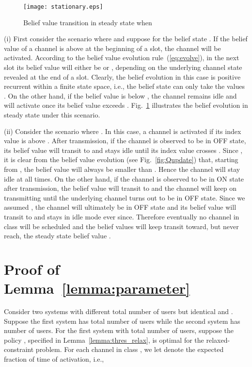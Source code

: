 \documentclass[11pt,twocolumn]{IEEEtran}
\begin{document}
\begin{figure}
\centering
\texttt{[image: stationary.eps]}
\vspace{-4pt}
\caption{Belief value transition in steady state when }
\vspace{-3pt}
\label{fig:belief_pos}
\end{figure}

(i) First consider the scenario where  and suppose  for the belief state . If the belief value of a channel is above  at the beginning of a slot, the channel will be activated. According to the belief value evolution rule~(\ref{eq:evolve}), in the next slot its belief value will either be  or , depending on the underlying channel state revealed at the end of a slot. Clearly, the belief evolution in this case is positive recurrent within a finite state space, i.e., the belief state can only take the values . On the other hand, if the belief value is below , the channel remains idle and will activate once its belief value exceeds . Fig.~\ref{fig:belief_pos} illustrates the belief evolution in steady state under this scenario.
\vspace{4pt}

(ii) Consider the scenario where . In this case, a channel is activated if its index value is above . After transmission, if the channel is observed to be in OFF state, its belief value will transit to  and stays idle until its index value crosses . Since , it is clear from the belief value evolution (see Fig.~\ref{fig:Qupdate}) that, starting from , the belief value will always be smaller than . Hence the channel will stay idle at all times. On the other hand, if the channel is observed to be in ON state after transmission, the belief value will transit to  and the channel will keep on transmitting until the underlying channel turns out to be in OFF state. Since we assumed , the channel will ultimately be in OFF state and its belief value will transit to  and stays in idle mode ever since. Therefore eventually no channel in class  will be scheduled and the belief values will keep transit toward, but never reach, the steady state belief value .

\section{Proof of Lemma~\ref{lemma:parameter}}
\label{appen:peruser}

Consider two systems with different total number of users but identical  and . Suppose the first system has  total number of users while the second system has  number of users. For the first system with  total number of users, suppose the policy , specified in Lemma~\ref{lemma:thres_relax}, is optimal for the relaxed-constraint problem. For each channel  in class , we let  denote the expected fraction of time of activation, i.e.,
\end{document}
